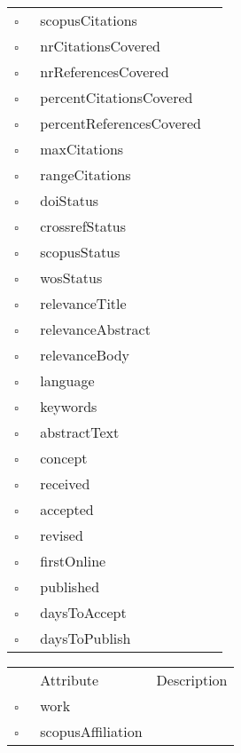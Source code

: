 \begin{table}
\begin{longtable}{llp{8cm}}
$\square$\ & scopusCitations &  \\
$\square$\ & nrCitationsCovered &  \\
$\square$\ & nrReferencesCovered &  \\
$\square$\ & percentCitationsCovered &  \\
$\square$\ & percentReferencesCovered &  \\
$\square$\ & maxCitations &  \\
$\square$\ & rangeCitations &  \\
$\square$\ & doiStatus &  \\
$\square$\ & crossrefStatus &  \\
$\square$\ & scopusStatus &  \\
$\square$\ & wosStatus &  \\
$\square$\ & relevanceTitle &  \\
$\square$\ & relevanceAbstract &  \\
$\square$\ & relevanceBody &  \\
$\square$\ & language &  \\
$\square$\ & keywords &  \\
$\square$\ & abstractText &  \\
$\square$\ & concept &  \\
$\square$\ & received &  \\
$\square$\ & accepted &  \\
$\square$\ & revised &  \\
$\square$\ & firstOnline &  \\
$\square$\ & published &  \\
$\square$\ & daysToAccept &  \\
$\square$\ & daysToPublish &  \\
\end{longtable}
\label{attr:Work}
\end{table}

\clearpage
\begin{table}
\caption{WorkAffiliation  }

\begin{longtable}{llp{8cm}}
& Attribute & Description \\
$\square$\ & work &  \\
$\square$\ & scopusAffiliation &  \\
\end{longtable}
\label{attr:WorkAffiliation}
\end{table}
